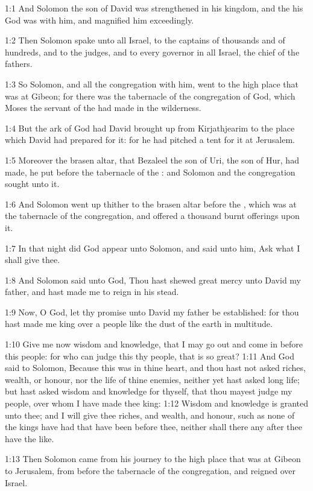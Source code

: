 

1:1 And Solomon the son of David was strengthened in his kingdom, and the \LORD his God was with him, and magnified him exceedingly.

1:2 Then Solomon spake unto all Israel, to the captains of thousands and of hundreds, and to the judges, and to every governor in all Israel, the chief of the fathers.

1:3 So Solomon, and all the congregation with him, went to the high place that was at Gibeon; for there was the tabernacle of the congregation of God, which Moses the servant of the \LORD had made in the wilderness.

1:4 But the ark of God had David brought up from Kirjathjearim to the place which David had prepared for it: for he had pitched a tent for it at Jerusalem.

1:5 Moreover the brasen altar, that Bezaleel the son of Uri, the son of Hur, had made, he put before the tabernacle of the \LORD: and Solomon and the congregation sought unto it.

1:6 And Solomon went up thither to the brasen altar before the \LORD, which was at the tabernacle of the congregation, and offered a thousand burnt offerings upon it.

1:7 In that night did God appear unto Solomon, and said unto him, Ask what I shall give thee.

1:8 And Solomon said unto God, Thou hast shewed great mercy unto David my father, and hast made me to reign in his stead.

1:9 Now, O \LORD God, let thy promise unto David my father be established: for thou hast made me king over a people like the dust of the earth in multitude.

1:10 Give me now wisdom and knowledge, that I may go out and come in before this people: for who can judge this thy people, that is so great?  1:11 And God said to Solomon, Because this was in thine heart, and thou hast not asked riches, wealth, or honour, nor the life of thine enemies, neither yet hast asked long life; but hast asked wisdom and knowledge for thyself, that thou mayest judge my people, over whom I have made thee king: 1:12 Wisdom and knowledge is granted unto thee; and I will give thee riches, and wealth, and honour, such as none of the kings have had that have been before thee, neither shall there any after thee have the like.

1:13 Then Solomon came from his journey to the high place that was at Gibeon to Jerusalem, from before the tabernacle of the congregation, and reigned over Israel.

